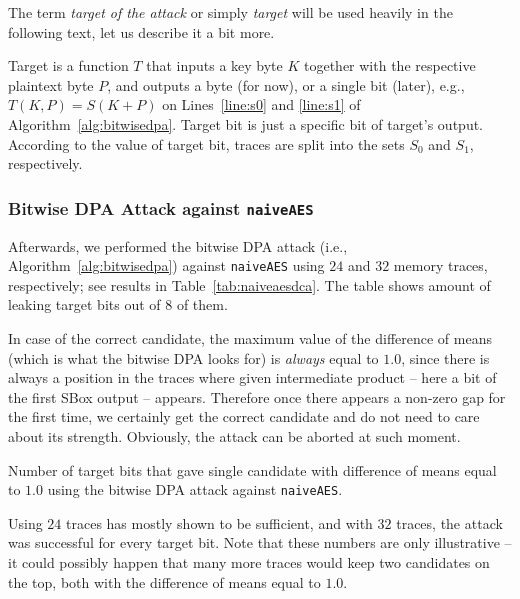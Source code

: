 	\begin{note}
	\label{note:target}
		The term {\em target of the attack} or simply {\em target} will be used heavily in the following text, let us describe it a bit more.
		
		Target is a function $T$ that inputs a key byte $K$ together with the respective plaintext byte $P$, and outputs a byte (for now), or a single bit (later), e.g., $T(K,P) = S(K+P)$ on Lines~\ref{line:s0} and \ref{line:s1} of Algorithm~\ref{alg:bitwisedpa}. Target bit is just a specific bit of target's output. According to the value of target bit, traces are split into the sets $S_0$ and $S_1$, respectively.
	\end{note}

\subsubsection{Bitwise DPA Attack against {\tt naiveAES}}
	
	Afterwards, we performed the bitwise DPA attack (i.e., Algorithm~\ref{alg:bitwisedpa}) against {\tt naiveAES} using $24$ and $32$ memory traces, respectively; see results in Table~\ref{tab:naiveaesdca}. The table shows amount of leaking target bits out of $8$ of them.
	
	\begin{note}
	\label{note:unprotect}
		In case of the correct candidate, the maximum value of the difference of means (which is what the bitwise DPA looks for) is {\em always} equal to $1.0$, since there is always a position in the traces where given intermediate product -- here a bit of the first SBox output -- appears. Therefore once there appears a non-zero gap for the first time, we certainly get the correct candidate and do not need to care about its strength. Obviously, the attack can be aborted at such moment.
	\end{note}
	
	\begin{table}[h]
		\begin{center}
		
		\end{center}
	\caption{Number of target bits that gave single candidate with difference of means equal to $1.0$ using the bitwise DPA attack against {\tt naiveAES}.}
	\label{tab:naiveaesdca}
	\end{table}
	
	Using $24$ traces has mostly shown to be sufficient, and with $32$ traces, the attack was successful for every target bit. Note that these numbers are only illustrative -- it could possibly happen that many more traces would keep two candidates on the top, both with the difference of means equal to $1.0$.
	
